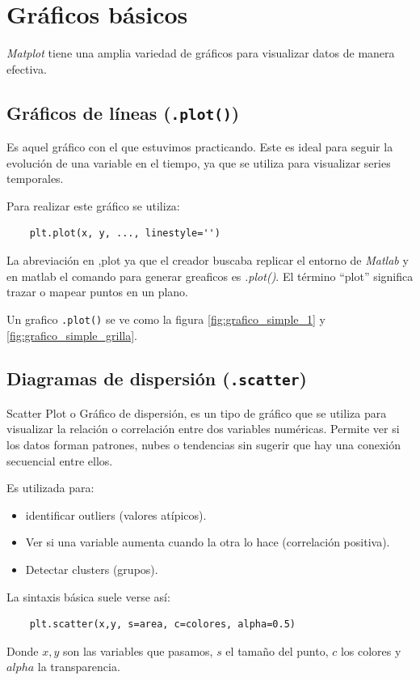 \section{Gráficos básicos}

\textit{Matplot} tiene una amplia variedad de gráficos para visualizar datos de manera efectiva. 

\subsection{Gráficos de líneas (\texttt{.plot()})}

Es aquel gráfico con el que estuvimos practicando. Este es ideal para seguir la evolución de una variable en el tiempo, ya que se utiliza para visualizar series temporales.

Para realizar este gráfico se utiliza:
\begin{verbatim}
    plt.plot(x, y, ..., linestyle='')
\end{verbatim}

La abreviación en ,plot ya que el creador buscaba replicar el entorno de \textit{Matlab} y en matlab el comando para generar greaficos es \textit{.plot()}. El término ``plot'' significa trazar o mapear puntos en un plano.

Un grafico \texttt{.plot()} se ve como la figura \ref{fig:grafico_simple_1} y \ref{fig:grafico_simple_grilla}.


\subsection{Diagramas de dispersión (\texttt{.scatter})}

Scatter Plot o Gráfico de dispersión, es un tipo de gráfico que se utiliza para visualizar la relación o correlación entre dos variables numéricas. Permite ver si los datos forman patrones, nubes o tendencias sin sugerir que hay una conexión secuencial entre ellos.

Es utilizada para: 
\begin{itemize}
    \item identificar outliers (valores atípicos).
    \item Ver si una variable aumenta cuando la otra lo hace (correlación positiva).
    \item Detectar clusters (grupos).
\end{itemize}

La sintaxis básica suele verse así:
\begin{verbatim}
    plt.scatter(x,y, s=area, c=colores, alpha=0.5)
\end{verbatim}
Donde \(x,y\) son las variables que pasamos, \(s\) el tamaño del punto, \(c\) los colores y \(alpha\) la transparencia.

